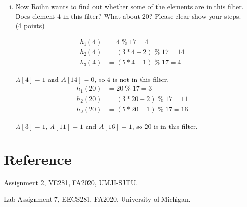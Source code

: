 \documentclass[11pt]{exam}
\begin{document}
\begin{enumerate}[i)]
\begin{solution}
\end{solution}
\item Now Roihn wants to find out whether some of the elements are in this filter. Does element 4 in this filter? What about 20? Please clear show your steps. (4 points)
\begin{solution}
\begin{equation*}
    \begin{aligned}
        h_{1}(4) &= 4 \;\%\; 17 = 4\\
        h_{2}(4) &= (3*4+2) \;\%\; 17 = 14\\
        h_{3}(4) &= (5*4+1) \;\%\; 17 = 4
    \end{aligned}
\end{equation*}
\par
$A[4]=1$ and $A[14]=0$, so $4$ is not in this filter.
\begin{equation*}
    \begin{aligned}
        h_{1}(20) &= 20 \;\%\; 17 = 3\\
        h_{2}(20) &= (3*20+2) \;\%\; 17 = 11\\
        h_{3}(20) &= (5*20+1) \;\%\; 17 = 16
    \end{aligned}
\end{equation*}
\par
$A[3]=1$, $A[11]=1$ and $A[16]=1$, so $20$ is in this filter.
\end{solution}
\end{enumerate}

\section*{Reference}
Assignment 2, VE281, FA2020, UMJI-SJTU.

Lab Assignment 7, EECS281, FA2020, University of Michigan.
\end{document}
